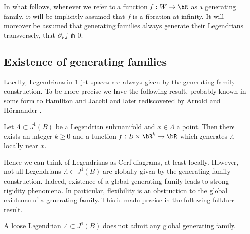 In what follows, whenever we refer to a function $f:W \to \bR$ as a generating family, it will be implicitly assumed that $f$ is a fibration at infinity. It will moreover be assumed that generating families always generate their Legendrians transversely, \ie that $\partial_F f \pitchfork 0$.

\subsection{Existence of generating families}

Locally, Legendrians in $1$-jet spaces are always given by the generating family construction. To be more precise we have the following result, probably known in some form to Hamilton and Jacobi and later rediscovered by Arnold and Hörmander \cite{AGV85}.

\begin{proposition}
Let $\Lambda \subset J^1(B)$ be a Legendrian submanifold and $x \in \Lambda$ a point. Then there exists an integer $k \geq 0$ and a function $f: B \times \bR^k \to \bR$ which generates $\Lambda$ locally near $x$.
\end{proposition}

Hence we can think of Legendrians as Cerf diagrams, at least locally. However, not all Legendrians $\Lambda \subset J^1(B)$ are globally given by the generating family construction. Indeed, existence of a global generating family leads to strong rigidity phenomena. In particular, flexibility is an obstruction to the global existence of a generating family. This is made precise in the following folklore result.

\begin{proposition}\label{Proposition: global non-existence} A loose Legendrian $\Lambda \subset J^1(B)$ does not admit any global generating family.
\end{proposition}

